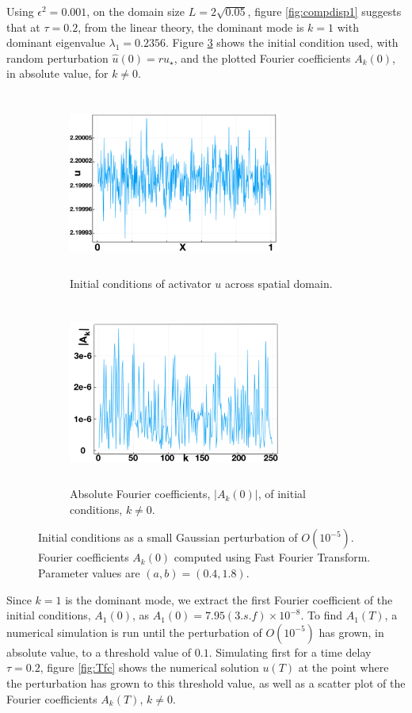 Using $\epsilon^2=0.001$, on the domain size $L=2\sqrt{0.05}$, figure \ref{fig:compdisp1} suggests that at $\tau=0.2$, from the linear theory, the dominant mode is $k=1$ with dominant eigenvalue $\lambda_1=0.2356$. Figure \ref{fig:icfc} shows the initial condition used, with random perturbation $\hat{u}(0)=ru_\star$, and the plotted Fourier coefficients $A_k(0)$, in absolute value, for $k\neq0$.
\begin{figure}[H]
    \centering
    \begin{subfigure}[b]{0.45\textwidth}
        \centering
        \includegraphics[width=7cm,height=6cm]{uic.png}
        \caption{Initial conditions of activator $u$ across spatial domain.}
        \label{}
    \end{subfigure}
    \hfill
    \begin{subfigure}[b]{0.45\textwidth}
        \centering
        \includegraphics[width=7cm,height=6cm]{uicfc.png}
        \caption{Absolute Fourier coefficients, $|A_k(0)|$, of initial conditions, $k\neq0$.}
        \label{fig:}
    \end{subfigure}
    \caption{Initial conditions as a small Gaussian perturbation of $O(10^{-5})$. Fourier coefficients $A_k(0)$ computed using Fast Fourier Transform. Parameter values are $(a,b)=(0.4,1.8)$.}
    \label{fig:icfc}
\end{figure}
Since $k=1$ is the dominant mode, we extract the first Fourier coefficient of the initial conditions, $A_1(0)$, as $A_1(0)=7.95(3.s.f)\times10^{-8}$. To find $A_1(T)$, a numerical simulation is run until the perturbation of $O(10^{-5})$ has grown, in absolute value, to a threshold value of $0.1$. Simulating first for a time delay $\tau=0.2$, figure \ref{fig:Tfc} shows the numerical solution $u(T)$ at the point where the perturbation has grown to this threshold value, as well as a scatter plot of the Fourier coefficients $A_k(T)$, $k\neq0$.
